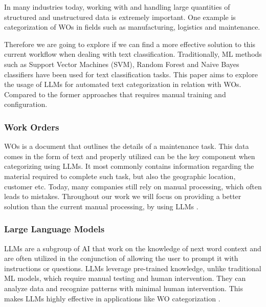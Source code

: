 \documentclass{article}
\begin{document}
In many industries today, working with and handling large quantities of structured and unstructured data is
extremely important.
One example is categorization of WOs in fields such as manufacturing, logistics and maintenance.

Therefore we are going to explore if we can find a more effective solution to this current workflow
when dealing with text classification.
Traditionally, ML methods such as Support Vector Machines (SVM), Random Forest and Naive Bayes classifiers
have been used for text classification tasks.
This paper aims to explore the usage of LLMs for automated text categorization in relation with WOs.
Compared to the former approaches that requires manual training and configuration.

\subsubsection{Work Orders}

WOs is a document that outlines the details of a maintenance task.
This data comes in the form of text and properly utilized can be the key component when categorizing using LLMs.
It most commonly contains information regarding the material required to complete such task,
but also the geographic location, customer etc.
Today, many companies still rely on manual processing, which often leads to mistakes.
Throughout our work we will focus on providing a better solution than the current manual processing,
by using LLMs \cite{ibm2023} \cite{li2024}.

\subsubsection{Large Language Models}

LLMs are a subgroup of AI that work on the knowledge of next word context and are often utilized
in the conjunction of allowing the user to prompt it with instructions or questions.
LLMs leverage pre-trained knowledge, unlike traditional ML models, which require manual testing and human intervention.
They can analyze data and recognize patterns with minimal human intervention.
This makes LLMs highly effective in applications like WO categorization \cite{andersson2024}.
\end{document}

